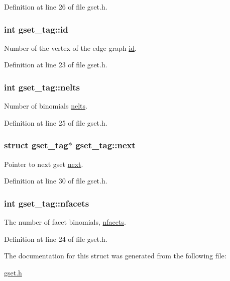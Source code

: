 Definition at line 26 of file gset.\-h.

\hypertarget{structgset__tag_ac376d7702448d0c772d8a6bafba1b049}{
\subsubsection[{id}]{\setlength{\rightskip}{0pt plus 5cm}int gset\-\_\-tag\-::id}}\label{structgset__tag_ac376d7702448d0c772d8a6bafba1b049}
Number of the vertex of the edge graph \hyperlink{structgset__tag_ac376d7702448d0c772d8a6bafba1b049}{id}. 

Definition at line 23 of file gset.\-h.

\hypertarget{structgset__tag_aabeeae6b191c2384977c7a43fcecd9ce}{
\subsubsection[{nelts}]{\setlength{\rightskip}{0pt plus 5cm}int gset\-\_\-tag\-::nelts}}\label{structgset__tag_aabeeae6b191c2384977c7a43fcecd9ce}
Number of binomials \hyperlink{structgset__tag_aabeeae6b191c2384977c7a43fcecd9ce}{nelts}. 

Definition at line 25 of file gset.\-h.

\hypertarget{structgset__tag_a221375aaa3d35df3270c7e551ded215b}{
\subsubsection[{next}]{\setlength{\rightskip}{0pt plus 5cm}struct {\bf gset\-\_\-tag}$\ast$ gset\-\_\-tag\-::next}}\label{structgset__tag_a221375aaa3d35df3270c7e551ded215b}
Pointer to next gset \hyperlink{structgset__tag_a221375aaa3d35df3270c7e551ded215b}{next}. 

Definition at line 30 of file gset.\-h.

\hypertarget{structgset__tag_ae35229febf28ec3a6918b982dd46bb36}{
\subsubsection[{nfacets}]{\setlength{\rightskip}{0pt plus 5cm}int gset\-\_\-tag\-::nfacets}}\label{structgset__tag_ae35229febf28ec3a6918b982dd46bb36}
The number of facet binomials, \hyperlink{structgset__tag_ae35229febf28ec3a6918b982dd46bb36}{nfacets}. 

Definition at line 24 of file gset.\-h.



The documentation for this struct was generated from the following file\-:\begin{DoxyCompactItemize}
\item 
\hyperlink{gset_8h}{gset.\-h}\end{DoxyCompactItemize}
